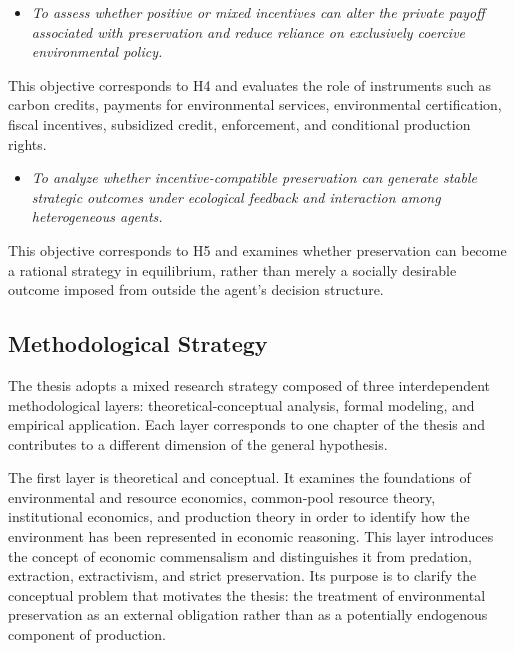 \begin{itemize}

    \item[\textbf{G4.}]
    
    \textit{To assess whether positive or mixed incentives can alter the private payoff associated with preservation and reduce reliance on exclusively coercive environmental policy.}

\end{itemize}

This objective corresponds to H4 and evaluates the role of instruments such as carbon credits, payments for environmental services, environmental certification, fiscal incentives, subsidized credit, enforcement, and conditional production rights.

\begin{itemize}

    \item[\textbf{G5.}]
    
    \textit{To analyze whether incentive-compatible preservation can generate stable strategic outcomes under ecological feedback and interaction among heterogeneous agents.}

\end{itemize}

This objective corresponds to H5 and examines whether preservation can become a rational strategy in equilibrium, rather than merely a socially desirable outcome imposed from outside the agent's decision structure.

\subsection{Methodological Strategy}

The thesis adopts a mixed research strategy composed of three interdependent methodological layers: theoretical-conceptual analysis, formal modeling, and empirical application. Each layer corresponds to one chapter of the thesis and contributes to a different dimension of the general hypothesis.

The first layer is theoretical and conceptual. It examines the foundations of environmental and resource economics, common-pool resource theory, institutional economics, and production theory in order to identify how the environment has been represented in economic reasoning. This layer introduces the concept of economic commensalism and distinguishes it from predation, extraction, extractivism, and strict preservation. Its purpose is to clarify the conceptual problem that motivates the thesis: the treatment of environmental preservation as an external obligation rather than as a potentially endogenous component of production.

